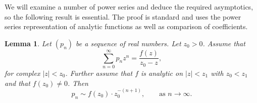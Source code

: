 \documentclass[12pt]{article}
\newcommand{\1}{\mathds{1}}
\renewcommand{\d}{\mathrm{d}}
\theoremstyle{definition}
\theoremstyle{plain}
\newtheorem{Lemma}[definition]{Lemma}
\theoremstyle{remark}
\newtheorem{Remark}{Remark}
\begin{document}
We will examine a number of power series and deduce the required asymptotics, so the following result is essential. The proof is standard and uses the power series representation of analytic functions as well as comparison of coefficients.
\begin{Lemma}\label{asymptotic_powerseries}
    Let $(p_n)$ be a sequence of real numbers. Let $z_0>0$. Assume that
\begin{equation}
\sum_{n=0}^\infty p_n z^n = \frac{f(z)}{z_0-z},
\end{equation}
for complex $|z| < z_0$. Further assume that $f$ is analytic on $|z|<z_1$ with $z_0<z_1$ and that $f(z_0)\neq 0$. Then
$$
p_n \sim f(z_0) \cdot z_0^{-(n+1)},\qquad \text{as $n\to\infty$.}
$$
\end{Lemma}
\end{document}
